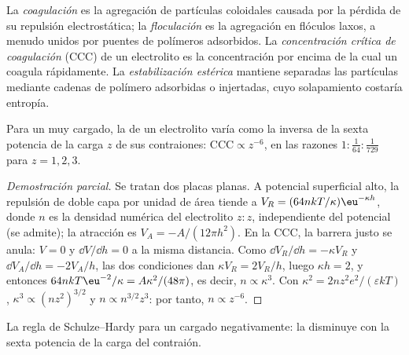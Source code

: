 \begin{definition}\label{def:b3:colloids:stability}
La \emph{coagulación} es la agregación de partículas coloidales
causada por la pérdida de su repulsión electrostática; la \emph{floculación}
es la agregación en flóculos laxos, a menudo unidos por puentes de polímeros adsorbidos. La
\emph{concentración crítica de coagulación}
(CCC) de un electrolito es la concentración por encima de la cual un
 coagula rápidamente. La \emph{estabilización estérica}
mantiene separadas las partículas mediante cadenas de polímero adsorbidas o injertadas,
cuyo solapamiento costaría entropía.
\end{definition}

\begin{proposition}\label{prop:b3:colloids:schulze-hardy}
Para un  muy cargado, la  de un
electrolito varía como la inversa de la sexta potencia de la carga $z$ de sus
contraiones: $\text{CCC} \propto z^{-6}$, en las razones $1 : \frac{1}{64} : \frac{1}{729}$ para $z = 1, 2, 3$.
\end{proposition}

\begin{proof}[Demostración parcial]
Se tratan dos placas planas. A potencial superficial alto, la repulsión de doble capa por
unidad de área tiende a $V_R = (64nkT/\kappa)\eu^{-\kappa h}$, donde $n$ es la densidad numérica del
electrolito $z{:}z$, independiente del potencial (se admite); la atracción es $V_A =
-A/(12\pi h^2)$. En la CCC, la barrera justo se anula: $V = 0$ y $\dd V/\dd h = 0$ a la misma
distancia. Como $\dd V_R/\dd h = -\kappa V_R$ y $\dd V_A/\dd h = -2V_A/h$, las dos condiciones dan
$\kappa V_R = 2V_R/h$, luego $\kappa h = 2$, y entonces $64nkT\eu^{-2}/\kappa = A\kappa^2/(48\pi)$, es decir, $n \propto \kappa^3$. Con
$\kappa^2 = 2nz^2e^2/(\varepsilon kT)$, $\kappa^3 \propto (nz^2)^{3/2}$ y $n \propto n^{3/2}z^3$: por tanto, $n \propto z^{-6}$.
\end{proof}

\begin{omfigure}

{\small La regla de Schulze--Hardy para un  cargado negativamente: la  disminuye con la sexta potencia de la carga del contraión.}
\end{omfigure}

